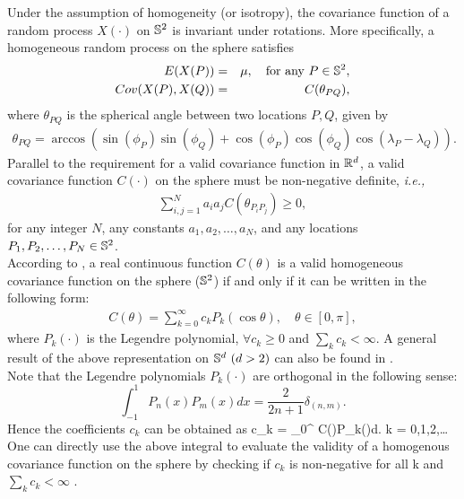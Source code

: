 Under the assumption of homogeneity (or isotropy), the covariance function of a random process $X(\cdot)$ on $\mathbb{S}^2$ is invariant under rotations. More specifically, a homogeneous random process on the sphere satisfies
	\begin{eqnarray*}
	E(X(P)) &=& \mu, \quad \mbox{for any } P \in \mathbb{S}^2, \\
		Cov(X(P),X(Q)) &=& C(\theta_{PQ}),
	\end{eqnarray*}
where $\theta_{PQ}$ is the spherical angle between two locations $P, Q$, given by 
	\begin{eqnarray*}
		\theta_{PQ}  = \arccos\left(\sin(\phi_P)\sin(\phi_Q) + \cos(\phi_P)\cos(\phi_Q)\cos(\lambda_P-\lambda_Q)\right).
	\end{eqnarray*}
Parallel to the requirement for a valid covariance function in $\mathbb{R}^d$, a valid covariance function $C(\cdot)$ on the sphere must be non-negative definite, {\em i.e.,}
	\begin{eqnarray*}
	\sum_{i,j=1}^{N} a_i a_j C(\theta_{P_iP_j}) \ge 0,
    \end{eqnarray*}
for any integer $N$, any constants $a_1, a_2, \ldots, a_N$, and any locations $P_1, P_2, \ldots, P_N \in \mathbb{S}^2$. \\

According to \cite{schoenberg1942}, a real continuous function $C(\theta)$ is a valid homogeneous covariance function on the sphere ($\mathbb{S}^2$) if and only if it can be written in the following form:
	\begin{eqnarray*} \label{covs2_sum}
	C(\theta) = \sum_{k = 0}^\infty c_k P_k(\cos\theta), \quad \theta \in [0,\pi],
	\end{eqnarray*}
where $P_k(\cdot)$ is the Legendre polynomial, $\forall c_k\ge 0$ and $\sum_k c_k < \infty$. A general result of the above representation on $\mathbb{S}^d\ (d > 2)$ can also be found in \cite{schoenberg1942}. \\
	
Note that the Legendre polynomials $P_k(\cdot)$ are orthogonal in the following sense:
	\[
		\int_{-1}^{1} P_{n}(x)P_{m}(x)dx = \frac{2}{2n+1}\delta_{(n,m)}.
	\]
Hence the coefficients $c_k$ can be obtained as
	\beq \label{covs2_coef}
	c_{k} = \int_0^{\pi} C(\theta)P_{k}(\cos\theta)d\theta. \quad k = 0,1,2,\ldots
	\eeq
One can directly use the above integral to evaluate the validity of a homogenous covariance function on the sphere by checking if $c_k$ is non-negative for all k and $\sum_k c_k < \infty$ . \\
	
